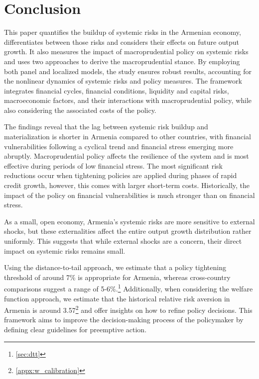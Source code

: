 \section{Conclusion}
This paper quantifies the buildup of systemic risks in the Armenian economy, differentiates between those risks and considers their effects on future output growth. It also measures the impact of macroprudential policy on systemic risks and uses two approaches to derive the macroprudential stance. By employing both panel and localized models, the study ensures robust results, accounting for the nonlinear dynamics of systemic risks and policy measures. The framework integrates financial cycles, financial conditions, liquidity and capital risks, macroeconomic factors, and their interactions with macroprudential policy, while also considering the associated costs of the policy.

The findings reveal that the lag between systemic risk buildup and materialization is shorter in Armenia compared to other countries, with financial vulnerabilities following a cyclical trend and financial stress emerging more abruptly. Macroprudential policy affects the resilience of the system and is most effective during periods of low financial stress. The most significant risk reductions occur when tightening policies are applied during phases of rapid credit growth, however, this comes with larger short-term costs. Historically, the impact of the policy on financial vulnerabilities is much stronger than on financial stress.

As a small, open economy, Armenia’s systemic risks are more sensitive to external shocks, but these externalities affect the entire output growth distribution rather uniformly. This suggests that while external shocks are a concern, their direct impact on systemic risks remains small.

Using the distance-to-tail approach, we estimate that a policy tightening threshold of around 7\% is appropriate for Armenia, whereas cross-country comparisons suggest a range of 5-6\%.\footnote{\autoref{sec:dtt}} Additionally, when considering the welfare function approach, we estimate that the historical relative risk aversion in Armenia is around 3.57\footnote{\ref{appx:w_calibration}} and offer insights on how to refine policy decisions. This framework aims to improve the decision-making process of the policymaker by defining clear guidelines for preemptive action.